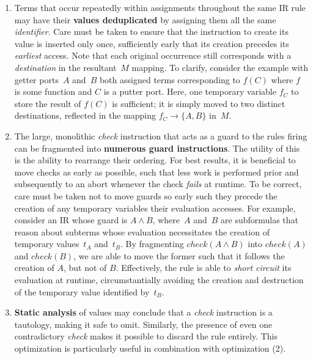\begin{enumerate}
	\item Terms that occur repeatedly within assignments throughout the same IR rule may have their \textbf{values deduplicated} by assigning them all the same \textit{identifier}. Care must be taken to ensure that the instruction to create its value is inserted only once, sufficiently early that its creation precedes its \textit{earliest} access. Note that each original occurrence still corresponds with a \textit{destination} in the resultant~$M$ mapping. To clarify, consider the example with getter ports~$A$ and~$B$ both assigned terms corresponding to $f(C)$ where $f$ is some function and $C$ is a putter port. Here, one temporary variable $f_C$ to store the result of $f(C)$ is sufficient; it is simply moved to two distinct destinations, reflected in the mapping $f_C\rightarrow\{A,B\}$ in~$M$.
	
	\item The large, monolithic \textit{check} instruction that acts as a guard to the rules firing can be fragmented into \textbf{numerous guard instructions}. The utility of this is the ability to rearrange their ordering. For best results, it is beneficial to move checks as early as possible, such that less work is performed prior and subsequently to an abort whenever the check \textit{fails} at runtime. To be correct, care must be taken not to move guards so early such they precede the creation of any temporary variables their evaluation accesses. For example, consider an IR 
	whose guard is $A\wedge{}B$, where~$A$ and~$B$ are subformulas that reason about subterms whose evaluation necessitates the creation of temporary values~$t_A$ and~$t_B$. By fragmenting $check(A\wedge{}B)$ into $check(A)$ and $check(B)$, we are able to move the former such that it follows the creation of $A$, but not of $B$. Effectively, the rule is able to \textit{short circuit} its evaluation at runtime, circumstantially avoiding the creation and destruction of the temporary value identified by~$t_B$.
	
	\item \textbf{Static analysis} of values may conclude that a \textit{check} instruction is a tautology, making it safe to omit. Similarly, the presence of even one contradictory \textit{check} makes it possible to discard the rule entirely. This optimization is particularly useful in combination with optimization (2).
\end{enumerate}

